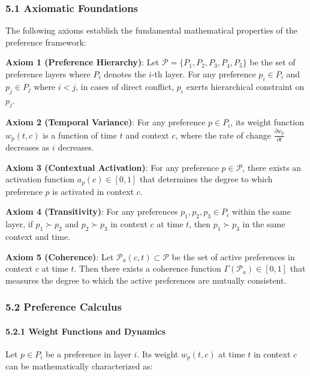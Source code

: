 \documentclass[
]{article}
\begin{document}
\subsubsection{5.1 Axiomatic Foundations}\label{axiomatic-foundations}

The following axioms establish the fundamental mathematical properties
of the preference framework:

\textbf{Axiom 1 (Preference Hierarchy)}: Let
\(\mathcal{P} = \{P_1, P_2, P_3, P_4, P_5\}\) be the set of preference
layers where \(P_i\) denotes the \(i\)-th layer. For any preference
\(p_i \in P_i\) and \(p_j \in P_j\) where \(i < j\), in cases of direct
conflict, \(p_i\) exerts hierarchical constraint on \(p_j\).

\textbf{Axiom 2 (Temporal Variance)}: For any preference \(p \in P_i\),
its weight function \(w_p(t, c)\) is a function of time \(t\) and
context \(c\), where the rate of change
\(\frac{\partial w_p}{\partial t}\) decreases as \(i\) decreases.

\textbf{Axiom 3 (Contextual Activation)}: For any preference
\(p \in \mathcal{P}\), there exists an activation function
\(a_p(c) \in [0,1]\) that determines the degree to which preference
\(p\) is activated in context \(c\).

\textbf{Axiom 4 (Transitivity)}: For any preferences
\(p_1, p_2, p_3 \in P_i\) within the same layer, if \(p_1 \succ p_2\)
and \(p_2 \succ p_3\) in context \(c\) at time \(t\), then
\(p_1 \succ p_3\) in the same context and time.

\textbf{Axiom 5 (Coherence)}: Let
\(\mathcal{P}_a(c,t) \subset \mathcal{P}\) be the set of active
preferences in context \(c\) at time \(t\). Then there exists a
coherence function \(\Gamma(\mathcal{P}_a) \in [0,1]\) that measures the
degree to which the active preferences are mutually consistent.

\subsubsection{5.2 Preference Calculus}\label{preference-calculus}

\paragraph{5.2.1 Weight Functions and
Dynamics}\label{weight-functions-and-dynamics}

Let \(p \in P_i\) be a preference in layer \(i\). Its weight
\(w_p(t, c)\) at time \(t\) in context \(c\) can be mathematically
characterized as:
\end{document}
